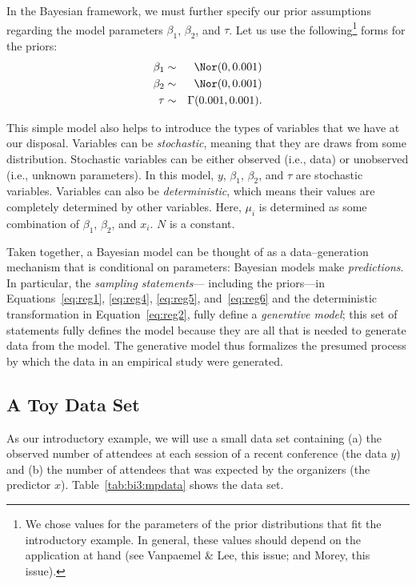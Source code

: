 In the Bayesian framework, we must further specify our prior assumptions regarding the model parameters $\beta_1$, $\beta_2$, and $\tau$. Let us use the following\footnote{We chose values for the parameters of the prior distributions that fit the introductory example. In general, these values should depend on the application at hand (see Vanpaemel \& Lee, this issue; and Morey, this issue).} forms for the priors:
\begin{eqnarray}
\beta_1 &\sim& \Nor(0, 0.001) \label{eq:reg4}\\
\beta_2 &\sim& \Nor(0, 0.001) \label{eq:reg5}\\
\tau    &\sim& \Gamma(0.001,0.001). \label{eq:reg6}
\end{eqnarray}

This simple model also helps to introduce the types of variables that we have at our disposal. Variables can be \emph{stochastic}, meaning that they are draws from some distribution. Stochastic variables can be either observed (i.e., data) or unobserved (i.e., unknown parameters). In this model, $y$, $\beta_1$, $\beta_2$, and $\tau$ are stochastic variables. Variables can also be \emph{deterministic}, which means their values are completely determined by other variables. Here, $\mu_i$ is determined as some combination of $\beta_1$, $\beta_2$, and $x_i$. $N$ is a constant.

{Taken together, a Bayesian model can be thought of as a data--generation mechanism that is conditional on parameters: Bayesian models make \emph{predictions}.
In particular, the \emph{sampling statements}--- including the priors---in Equations~\ref{eq:reg1}, \ref{eq:reg4}, \ref{eq:reg5}, and~\ref{eq:reg6} and the deterministic transformation in Equation~\ref{eq:reg2}, fully define a \emph{generative model}; this set of statements fully defines the model because they are all that is needed to generate data from the model. The generative model thus formalizes the presumed process by which the data in an empirical study were generated.} 

\subsection{A Toy Data Set}
As our introductory example, we will use a small data set containing (a) the observed number of attendees at each session of a recent conference (the data $y$) and (b) the number of attendees that was expected by the organizers (the predictor $x$). Table~\ref{tab:bi3:mpdata} shows the data set.

